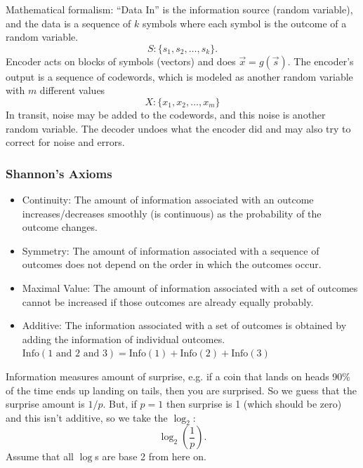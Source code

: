 \documentclass[12pt]{article}
\begin{document}

Mathematical formalism: ``Data In'' is the information source (random variable), and the data is a sequence of $k$ symbols where each symbol is the outcome of a random variable.
\[S:\{s_1,s_2,\dots,s_k\}.\]
Encoder acts on blocks of symbols (vectors) and does $\vec{x}=g(\vec{s})$. The encoder's output is a sequence of codewords, which is modeled as another random variable with $m$ different values
\[X:\{x_1,x_2,\dots,x_m\}\]
In transit, noise may be added to the codewords, and this noise is another random variable. The decoder undoes what the encoder did and may also try to correct for noise and errors.

\newpage
\subsubsection{Shannon's Axioms}
\begin{itemize}
    \item Continuity: The amount of information associated with an outcome increases/decreases smoothly (is continuous) as the probability of the outcome changes.
    \item Symmetry: The amount of information associated with a sequence of outcomes does not depend on the order in which the outcomes occur.
    \item Maximal Value: The amount of information associated with a set of outcomes cannot be increased if those outcomes are already equally probably. 
    \item Additive: The information associated with a set of outcomes is obtained by adding the information of individual outcomes. $\text{Info}(\text{1 and 2 and 3}) = \text{Info}(1) + \text{Info}(2) + \text{Info}(3)$
\end{itemize}

Information measures amount of surprise, e.g. if a coin that lands on heads 90\% of the time ends up landing on tails, then you are surprised. So we guess that the surprise amount is $1/p.$ But, if $p=1$ then surprise is 1 (which should be zero) and this isn't additive, so we take the $\log_2:$
\[\log_2\left(\frac{1}{p}\right).\] Assume that all $\log$s are base 2 from here on.
\end{document}
